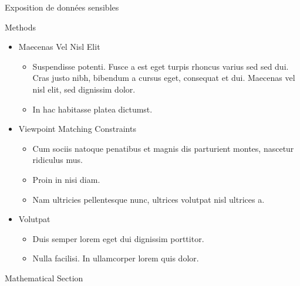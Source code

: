 \documentclass[final,hyperref={pdfpagelabels=false}]{beamer}
\begin{document}
\begin{frame}[t]
\begin{columns}[t]
\begin{column}{.465\textwidth}
\begin{block}{Exposition de données sensibles}
\end{block}


\begin{block}{Methods}

\begin{itemize}
\item Maecenas Vel Nisl Elit
\begin{itemize}
\item Suspendisse potenti. Fusce a est eget turpis rhoncus varius sed sed dui. Cras justo nibh, bibendum a cursus eget, consequat et dui. Maecenas vel nisl elit, sed dignissim dolor. 
\item In hac habitasse platea dictumst.
\end{itemize}

\item Viewpoint Matching Constraints
\begin{itemize}
\item Cum sociis natoque penatibus et magnis dis parturient montes, nascetur ridiculus mus. 
\item Proin in nisi diam.
\item Nam ultricies pellentesque nunc, ultrices volutpat nisl ultrices a.
\end{itemize}

\item Volutpat 
\begin{itemize}
\item Duis semper lorem eget dui dignissim porttitor.
\item Nulla facilisi. In ullamcorper lorem quis dolor.
\end{itemize}
\end{itemize}

\end{block}


\begin{block}{Mathematical Section}


\end{block}
\end{column}
\end{columns}
\end{frame}
\end{document}
